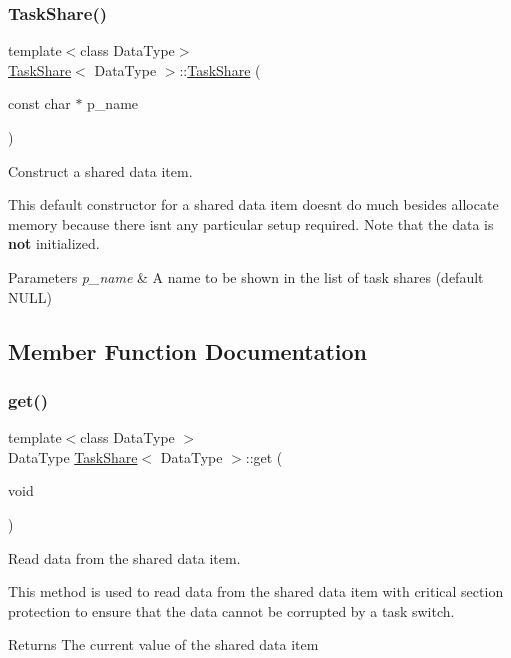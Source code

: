 \subsubsection{\texorpdfstring{Task\+Share()}{TaskShare()}}
{\footnotesize\ttfamily template$<$class Data\+Type$>$ \\
\mbox{\hyperlink{class_task_share}{Task\+Share}}$<$ Data\+Type $>$\+::\mbox{\hyperlink{class_task_share}{Task\+Share}} (\begin{DoxyParamCaption}\item[{const char $\ast$}]{p\+\_\+name }\end{DoxyParamCaption})\hspace{0.3cm}{\ttfamily [inline]}}



Construct a shared data item. 

This default constructor for a shared data item doesn\textquotesingle{}t do much besides allocate memory because there isn\textquotesingle{}t any particular setup required. Note that the data is {\bfseries not} initialized. 
\begin{DoxyParams}{Parameters}
{\em p\+\_\+name} & A name to be shown in the list of task shares (default {\ttfamily N\+U\+LL}) \\
\hline
\end{DoxyParams}


\subsection{Member Function Documentation}
\mbox{\label{class_task_share_a0cf8afd4f4d90c1e91ff2af9a004ecec}} 
\subsubsection{\texorpdfstring{get()}{get()}}
{\footnotesize\ttfamily template$<$class Data\+Type $>$ \\
Data\+Type \mbox{\hyperlink{class_task_share}{Task\+Share}}$<$ Data\+Type $>$\+::get (\begin{DoxyParamCaption}\item[{void}]{ }\end{DoxyParamCaption})}



Read data from the shared data item. 

This method is used to read data from the shared data item with critical section protection to ensure that the data cannot be corrupted by a task switch. \begin{DoxyReturn}{Returns}
The current value of the shared data item 
\end{DoxyReturn}
\mbox{\label{class_task_share_a5a4bac78053046c248896441a5b3a839}} 
